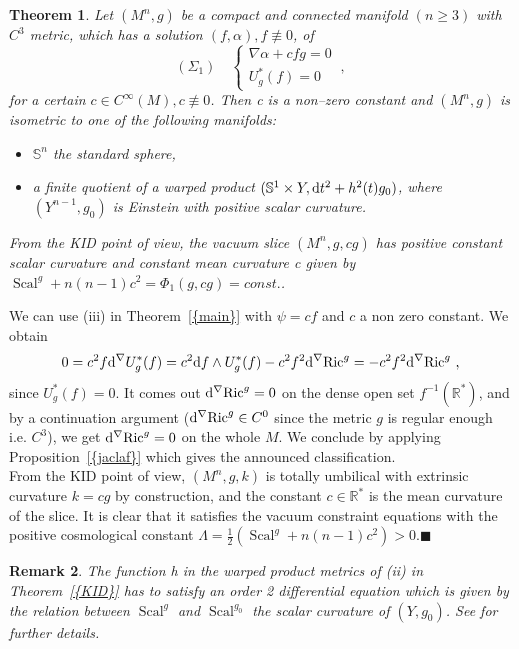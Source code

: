 \documentclass[a4paper,11pt,leqno]{amsart}
\numberwithin{equation}{section}
\theoremstyle{main}
\newtheorem{thm} {\bf  Theorem} [section]
\newtheorem{Rq}[thm]{\bf  Remark }
\begin{document}
\begin{thm}\label{KID}
Let $(M^n, g)$ be a compact and connected manifold $(n\ge3)$ with $C^3$ metric, which has a solution $(f,\alpha), f\not\equiv0$, of
$$(\Sigma_1)\quad \left\{
\begin{array}{l}
	 \nabla\alpha+ cfg= 0 \\
	 U_g^* (f)=0
\end{array}\right. \ ,$$
for a certain $c\in C^{\infty}(M), c\not\equiv 0$. Then c is a non--zero constant and $(M^n, g)$ is isometric to one of the following manifolds:
\begin{itemize}
	\item[(i)] ${{\mathbb S^{n}}}$ the standard sphere,
	\item[(ii)] a finite quotient  of a warped product $(\mathbb S^1 \times Y, {{\rm d}} t^2 + h^2 (t)g_0)$, where $(Y^{n-1},g_0)$ is Einstein with positive scalar curvature.
\end{itemize}
From the KID point of view, the vacuum slice $(M^n, g, cg)$ has positive constant scalar curvature and constant mean curvature c given by ${\operatorname{Scal}}^g +n(n-1)c^2= \Phi_1(g,cg)=const.$.
\end{thm}
\proof  We can use (iii) in Theorem~{\ref{{main}}} with $\psi=cf$ and $c$ a non zero constant. We obtain
$$0=c^2 f{{\rm d}} ^\nabla U_g^* (f) = c^2 {{\rm d}} f \wedge U_g^*(f) -c^2 f^2 {{\rm d}} ^\nabla{\operatorname{Ric}}^g=  -c^2 f^2 {{\rm d}} ^\nabla{\operatorname{Ric}}^g \ ,$$
since $U_g^* (f)=0$. It comes out ${{\rm d}} ^\nabla{\operatorname{Ric}}^g =0 $ on the dense open set $f^{-1}({{\mathbb R}}^*)$, and by a continuation argument (${{\rm d}} ^\nabla{\operatorname{Ric}}^g \in C^0$ since the metric $g$ is regular enough i.e. $C^3$), we get ${{\rm d}} ^\nabla{\operatorname{Ric}}^g =0 $ on the whole $M$. We conclude by applying Proposition~{\ref{{jaclaf}}} which gives the announced classification.\\
From the KID point of view, $(M^n, g, k)$ is totally umbilical with extrinsic curvature $k=cg$ by construction, and the constant $c\in {{\mathbb R}}^*$ is the mean curvature of the slice. It is clear that it satisfies the vacuum constraint equations with the positive cosmological constant $\Lambda=\frac{1}{2}\left({\operatorname{Scal}}^g + n(n-1)c^2\right)>0$.{\hfill $\blacksquare$ \medskip \\}

\begin{Rq} The function h in the warped product metrics of (ii) in Theorem~{\ref{{KID}}} has to satisfy an order 2 differential equation which is given by the relation between  ${\operatorname{Scal}}^g$ and ${\operatorname{Scal}}^{g_0}$ the scalar curvature of $(Y,g_0)$. See \cite{L} for further details.
\end{Rq}
\end{document}
